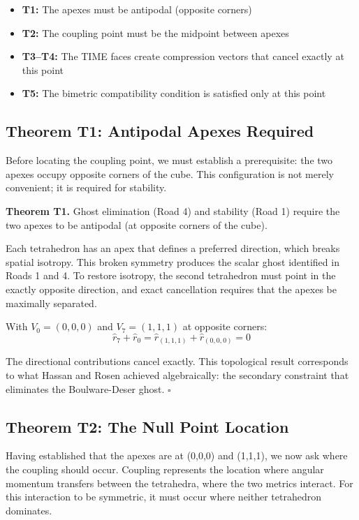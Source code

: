 \documentclass[aps,prd,preprint,superscriptaddress,showpacs,preprintnumbers,amsmath,amssymb,nofootinbib]{revtex4-2}
\begin{document}
\begin{itemize}
\item \textbf{T1:} The apexes must be antipodal (opposite corners)
\item \textbf{T2:} The coupling point must be the midpoint between apexes
\item \textbf{T3--T4:} The TIME faces create compression vectors that cancel exactly at this point
\item \textbf{T5:} The bimetric compatibility condition is satisfied only at this point
\end{itemize}

\subsection{Theorem T1: Antipodal Apexes Required}
\label{subsec:theorem-t1}

Before locating the coupling point, we must establish a prerequisite: the two apexes occupy opposite corners of the cube. This configuration is not merely convenient; it is required for stability.

\textbf{Theorem T1.} Ghost elimination (Road 4) and stability (Road 1) require the two apexes to be antipodal (at opposite corners of the cube).

Each tetrahedron has an apex that defines a preferred direction, which breaks spatial isotropy. This broken symmetry produces the scalar ghost identified in Roads 1 and 4. To restore isotropy, the second tetrahedron must point in the exactly opposite direction, and exact cancellation requires that the apexes be maximally separated.

With $V_0 = (0,0,0)$ and $V_7 = (1,1,1)$ at opposite corners:
\begin{equation}
\hat{r}_7 + \hat{r}_0 = \hat{r}_{(1,1,1)} + \hat{r}_{(0,0,0)} = 0
\end{equation}

The directional contributions cancel exactly. This topological result corresponds to what Hassan and Rosen achieved algebraically: the secondary constraint that eliminates the Boulware-Deser ghost. $\square$

\subsection{Theorem T2: The Null Point Location}
\label{subsec:theorem-t2}

Having established that the apexes are at (0,0,0) and (1,1,1), we now ask where the coupling should occur. Coupling represents the location where angular momentum transfers between the tetrahedra, where the two metrics interact. For this interaction to be symmetric, it must occur where neither tetrahedron dominates.
\end{document}
